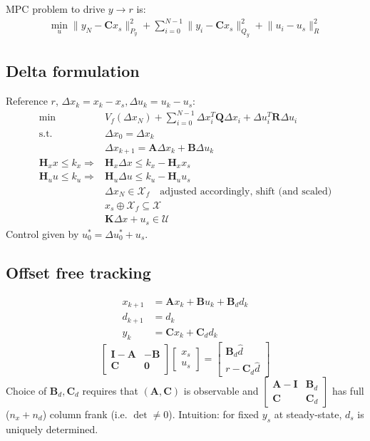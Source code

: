 \documentclass[landscape,a4paper,8pt]{scrartcl}
\newcommand{\mc}[1]{\mathcal{#1}}
\newcommand\vA{\bm{A}}
\newcommand\vB{\bm{B}}
\newcommand\vC{\bm{C}}
\newcommand\vH{\bm{H}}
\newcommand\vI{\bm{I}}
\newcommand\vK{\bm{K}}
\newcommand\vQ{\bm{Q}}
\newcommand\vR{\bm{R}}
\newcommand{\Me}[1]{\begin{bmatrix}#1\end{bmatrix}} %
\begin{document}
\begin{multicols*}{3}

MPC problem to drive $y \rightarrow r$ is:
\begin{align*}
\min_u \lVert y_N - \vC x_s \rVert_{P_y}^2 + \sum_{i=0}^{N-1}\lVert y_i - \vC x_s \rVert_{Q_y}^2 + \lVert u_i - u_s \rVert_R^2
\end{align*}

\subsection{Delta formulation}
Reference $r$, $\Delta x_k = x_k - x_s, \Delta u_k = u_k - u_s$:
\begin{align*}
\min\ & V_f(\Delta x_N) + \sum_{i=0}^{N-1} \Delta x_i^T\vQ\Delta x_i + \Delta u_i^T \vR \Delta u_i \\
\text{s.t. } & \Delta x_0 = \Delta x_k \\
             & \Delta x_{k+1} = \vA\Delta x_k + \vB \Delta u_k \\ %
\vH_x x \leq k_x \Rightarrow & \vH_x\Delta x \leq k_x - \vH_x x_s \\
\vH_u u \leq k_u \Rightarrow & \vH_u\Delta u \leq k_u - \vH_u u_s \\
                 & \Delta x_N \in \mc X_f \quad \text{adjusted accordingly, shift (and scaled)} \\
								 & x_s \oplus \mc X_f \subseteq \mc X \\
								 & \vK\Delta x + u_s \in \mc U
\end{align*}
Control given by $u_0^* = \Delta u_0^* + u_s$.

\subsection{Offset free tracking}
\begin{align*}
x_{k+1} &= \vA x_k + \vB u_k + \vB_d d_k \\
d_{k+1} &= d_k \\
y_k     &= \vC x_k + \vC_d d_k 
\end{align*}
\[
\Me{\vI-\vA & -\vB \\ \vC & \bm 0}\Me{x_s \\ u_s} = \Me{\vB_d \hat d \\ r - \vC_d \hat d}
\]
Choice of $\vB_d, \vC_d$ requires that $(\vA,\vC)$ is observable and $\Me{\vA-\vI & \vB_d \\ \vC & \vC_d}$ has full ($n_x + n_d$) column frank (i.e. $\det{} \neq 0$).
Intuition: for fixed $y_s$ at steady-state, $d_s$ is uniquely determined.


\end{multicols*}
\end{document}

